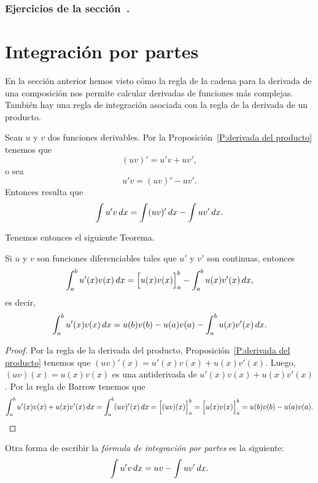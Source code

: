 \subsubsection*{Ejercicios de la sección~.}

\begin{enumerate}
  
\end{enumerate}  

\section{Integración por partes}

En la sección anterior hemos visto cómo la regla de la cadena para la derivada de una composición nos permite calcular derivadas de funciones más complejas.
También hay una regla de integración asociada con la regla de la derivada de un producto.

Sean $u$ y $v$ dos funciones derivables. Por la Proposición~\ref{P:derivada del producto} tenemos que
\[
(uv)'=u'v + u v',
\]
o sea 
\[
  u'v =(uv)'- u v'.
\]
Entonces resulta que 
$$
\int u'v \,dx = \int (uv)' \,dx - \int u v'\,dx.
$$

Tenemos entonces el siguiente Teorema.

\begin{theorem}
  Si $u$ y $v$ son funciones diferenciables tales que $u'$ y $v'$ son continuas, entonces 
  \[
  \int_a^b u'(x)v(x) \,dx = \Big[u(x)v(x)\Big]_a^b - \int_a^b u(x) v'(x)\,dx,
  \]
  es decir,
  \[
  \int_a^b u'(x)v(x) \,dx 
  = u(b)v(b)-u(a)v(a) - \int_a^b u(x) v'(x)\,dx.
  \]
\end{theorem}

\begin{proof}
  Por la regla de la derivada del producto, Proposición~\ref{P:derivada del producto} tenemos que $(uv)'(x)=u'(x)v(x) + u(x) v'(x)$. Luego, $(uv)(x)=u(x)v(x)$ es una antiderivada de $u'(x)v(x) + u(x) v'(x)$. Por la regla de Barrow tenemos que
  \begin{align*}
  \int_a^b u'(x)v(x) + u(x) v'(x) \,dx
  = \int_a^b (uv)'(x)\,dx 
  = \Big[(uv)(x)\Big]_a^b  
  = \Big[u(x)v(x)\Big]_a^b  
  = u(b)v(b)-u(a)v(a).
  \qedhere
  \end{align*}
\end{proof}

Otra forma de escribir la \emph{fórmula de integración por partes} es la siguiente:
$$
\int u'v \,dx = uv - \int u v'\,dx.
$$

